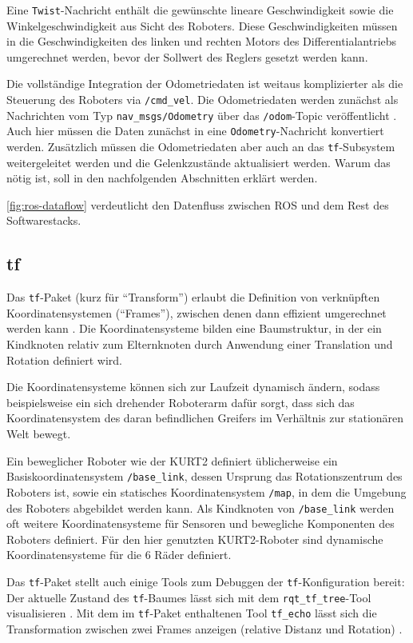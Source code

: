 \documentclass[german]{thesis_KBS}
\newcommand{\code}[1]{\texttt{#1}}  %
\begin{document}
Eine \code{Twist}-Nachricht enthält die gewünschte lineare Geschwindigkeit sowie
die Winkelgeschwindigkeit aus Sicht des Roboters. Diese Geschwindigkeiten müssen
in die Geschwindigkeiten des linken und rechten Motors des Differentialantriebs
umgerechnet werden, bevor der Sollwert des Reglers gesetzt werden kann.

Die vollständige Integration der Odometriedaten ist weitaus komplizierter als
die Steuerung des Roboters via \code{/cmd\_vel}. Die Odometriedaten werden
zunächst als Nachrichten vom Typ \code{nav\_msgs/Odometry} über das
\code{/odom}-Topic veröffentlicht \cite{ros-odometry}. Auch hier müssen die
Daten zunächst in eine \code{Odometry}-Nachricht konvertiert werden. Zusätzlich
müssen die Odometriedaten aber auch an das \code{tf}-Subsystem weitergeleitet
werden und die Gelenkzustände aktualisiert werden. Warum das nötig ist, soll in
den nachfolgenden Abschnitten erklärt werden.

\autoref{fig:ros-dataflow} verdeutlicht den Datenfluss zwischen ROS und dem
Rest des Softwarestacks.


\subsection{tf}

Das \code{tf}-Paket (kurz für "`Transform"') erlaubt die Definition von
verknüpften Koordinatensystemen ("`Frames"'), zwischen denen dann effizient
umgerechnet werden kann \cite{ros-tf}. Die Koordinatensysteme bilden eine
Baumstruktur, in der ein Kindknoten relativ zum Elternknoten durch Anwendung
einer Translation und Rotation definiert wird.

Die Koordinatensysteme können sich zur Laufzeit dynamisch ändern, sodass
beispielsweise ein sich drehender Roboterarm dafür sorgt, dass sich das
Koordinatensystem des daran befindlichen Greifers im Verhältnis zur stationären
Welt bewegt.

Ein beweglicher Roboter wie der KURT2 definiert üblicherweise ein
Basiskoordinatensystem \code{/base\_link}, dessen Ursprung das Rotationszentrum
des Roboters ist, sowie ein statisches Koordinatensystem \code{/map}, in dem die
Umgebung des Roboters abgebildet werden kann. Als Kindknoten von
\code{/base\_link} werden oft weitere Koordinatensysteme für Sensoren und
bewegliche Komponenten des Roboters definiert. Für den hier genutzten
KURT2-Roboter sind dynamische Koordinatensysteme für die 6 Räder definiert.

Das \code{tf}-Paket stellt auch einige Tools zum Debuggen der
\code{tf}-Konfiguration bereit: Der aktuelle Zustand des \code{tf}-Baumes lässt
sich mit dem \code{rqt\_tf\_tree}-Tool visualisieren \cite{rqt-tf-tree}. Mit dem
im \code{tf}-Paket enthaltenen Tool \code{tf\_echo} lässt sich die
Transformation zwischen zwei Frames anzeigen (relative Distanz und Rotation)
\cite{ros-tf}.
\end{document}
